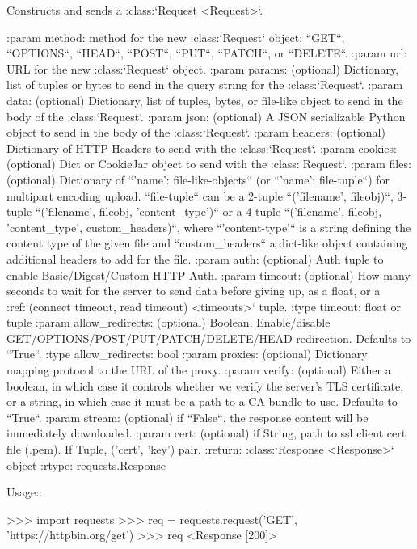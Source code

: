 \begin{DoxyVerb}Constructs and sends a :class:`Request <Request>`.

:param method: method for the new :class:`Request` object: ``GET``, ``OPTIONS``, ``HEAD``, ``POST``, ``PUT``, ``PATCH``, or ``DELETE``.
:param url: URL for the new :class:`Request` object.
:param params: (optional) Dictionary, list of tuples or bytes to send
    in the query string for the :class:`Request`.
:param data: (optional) Dictionary, list of tuples, bytes, or file-like
    object to send in the body of the :class:`Request`.
:param json: (optional) A JSON serializable Python object to send in the body of the :class:`Request`.
:param headers: (optional) Dictionary of HTTP Headers to send with the :class:`Request`.
:param cookies: (optional) Dict or CookieJar object to send with the :class:`Request`.
:param files: (optional) Dictionary of ``'name': file-like-objects`` (or ``{'name': file-tuple}``) for multipart encoding upload.
    ``file-tuple`` can be a 2-tuple ``('filename', fileobj)``, 3-tuple ``('filename', fileobj, 'content_type')``
    or a 4-tuple ``('filename', fileobj, 'content_type', custom_headers)``, where ``'content-type'`` is a string
    defining the content type of the given file and ``custom_headers`` a dict-like object containing additional headers
    to add for the file.
:param auth: (optional) Auth tuple to enable Basic/Digest/Custom HTTP Auth.
:param timeout: (optional) How many seconds to wait for the server to send data
    before giving up, as a float, or a :ref:`(connect timeout, read
    timeout) <timeouts>` tuple.
:type timeout: float or tuple
:param allow_redirects: (optional) Boolean. Enable/disable GET/OPTIONS/POST/PUT/PATCH/DELETE/HEAD redirection. Defaults to ``True``.
:type allow_redirects: bool
:param proxies: (optional) Dictionary mapping protocol to the URL of the proxy.
:param verify: (optional) Either a boolean, in which case it controls whether we verify
        the server's TLS certificate, or a string, in which case it must be a path
        to a CA bundle to use. Defaults to ``True``.
:param stream: (optional) if ``False``, the response content will be immediately downloaded.
:param cert: (optional) if String, path to ssl client cert file (.pem). If Tuple, ('cert', 'key') pair.
:return: :class:`Response <Response>` object
:rtype: requests.Response

Usage::

  >>> import requests
  >>> req = requests.request('GET', 'https://httpbin.org/get')
  >>> req
  <Response [200]>
\end{DoxyVerb}
 